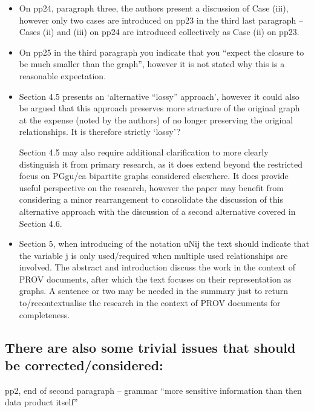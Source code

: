 \documentclass{article}
\newcommand{\showColour}{yes} %
\newcommand{\note}[2]{\ifthenelse{\equal{\showColour}{yes}}{\textcolor{#1}{#2}}{#2}}
\newcommand{\jwb}[1]{\note{blue}{#1}}
\begin{document}
\begin{itemize}
\item On pp24, paragraph three, the authors present a discussion of Case (iii), however only two cases are introduced on pp23 in the third last paragraph – Cases (ii) and (iii) on pp24 are introduced collectively as Case (ii) on pp23.

\item On pp25 in the third paragraph you indicate that you “expect the closure to be much smaller than the graph”, however it is not stated why this is a reasonable expectation.

\jwb{TODO: rm paren}

\item Section 4.5 presents an ‘alternative “lossy” approach’, however it could also be argued that this approach preserves more structure of the original graph at the expense (noted by the authors) of no longer preserving the original relationships.  It is therefore strictly ‘lossy’?  

\jwb{Done} 



Section 4.5 may also require additional clarification to more clearly distinguish it from primary research, as it does extend beyond the restricted focus on PGgu/ea bipartite graphs considered elsewhere.  It does provide useful perspective on the research, however the paper may benefit from considering a minor rearrangement to consolidate the discussion of this alternative approach with the discussion of a second alternative covered in Section 4.6.

\item Section 5, when introducing of the notation uNij the text should indicate that the variable j is only used/required when multiple used relationships are involved.
The abstract and introduction discuss the work in the context of PROV documents, after which the text focuses on their representation as graphs.  A sentence or two may be needed in the summary just to return to/recontextualise the research in the context of PROV documents for completeness.

\end{itemize}

\subsection*{There are also some trivial issues that should be corrected/considered:}

pp2, end of second paragraph – grammar “more sensitive information than then data product itself”
\end{document}

